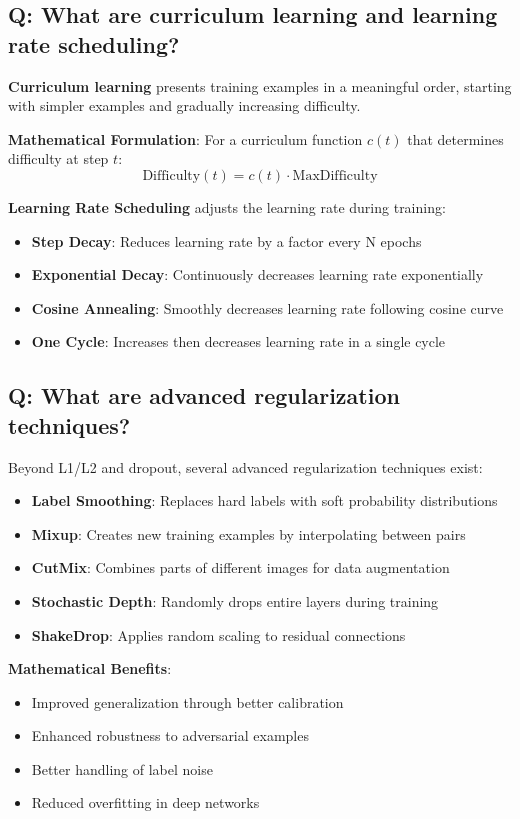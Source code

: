 \subsection*{\textcolor{primaryteal}{Q: What are curriculum learning and learning rate scheduling?}}
\textbf{Curriculum learning} presents training examples in a meaningful order, starting with simpler examples and gradually increasing difficulty.

\textbf{Mathematical Formulation}: For a curriculum function \(c(t)\) that determines difficulty at step \(t\):
\[
	\text{Difficulty}(t) = c(t) \cdot \text{MaxDifficulty}
\]

\textbf{Learning Rate Scheduling} adjusts the learning rate during training:
\begin{itemize}
	\item \textbf{Step Decay}: Reduces learning rate by a factor every N epochs
	\item \textbf{Exponential Decay}: Continuously decreases learning rate exponentially
	\item \textbf{Cosine Annealing}: Smoothly decreases learning rate following cosine curve
	\item \textbf{One Cycle}: Increases then decreases learning rate in a single cycle
\end{itemize}

\subsection*{\textcolor{primaryteal}{Q: What are advanced regularization techniques?}}
Beyond L1/L2 and dropout, several advanced regularization techniques exist:

\begin{itemize}
	\item \textbf{Label Smoothing}: Replaces hard labels with soft probability distributions
	\item \textbf{Mixup}: Creates new training examples by interpolating between pairs
	\item \textbf{CutMix}: Combines parts of different images for data augmentation
	\item \textbf{Stochastic Depth}: Randomly drops entire layers during training
	\item \textbf{ShakeDrop}: Applies random scaling to residual connections
\end{itemize}

\textbf{Mathematical Benefits}:
\begin{itemize}
	\item Improved generalization through better calibration
	\item Enhanced robustness to adversarial examples
	\item Better handling of label noise
	\item Reduced overfitting in deep networks
\end{itemize}

